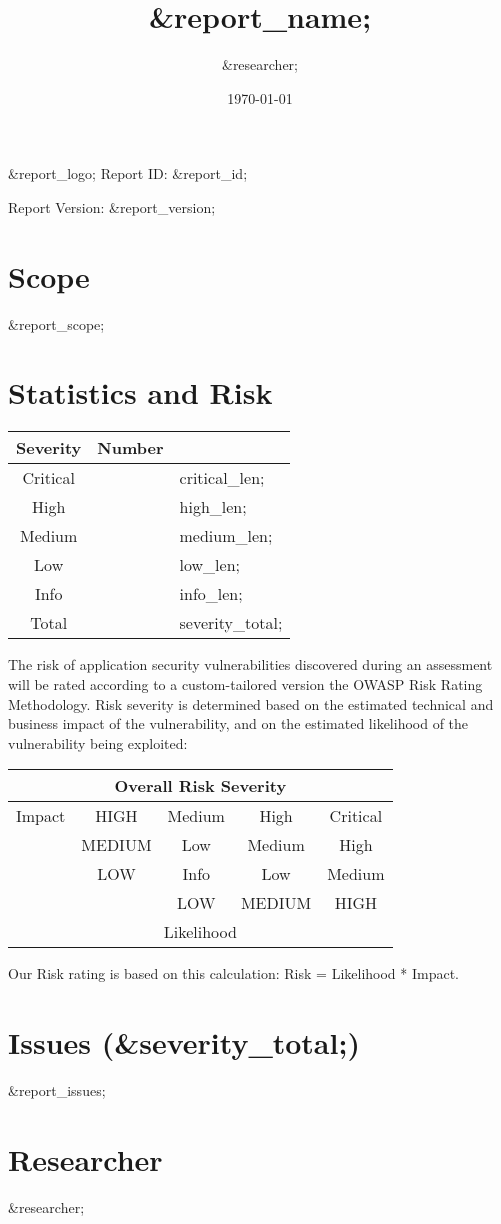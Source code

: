 \documentclass[12pt]{article}
\author{&researcher;}
\title{&report_name;}
\date{\today}
\begin{document}
\maketitle

&report_logo;
Report ID: &report_id;

Report Version: &report_version;
\newpage

\tableofcontents

\newpage

\section{Scope}

&report_scope;

\section{Statistics and Risk}

\begin{center}
\begin{tabular}{||c c||}
 \hline
 Severity & Number \\ [0.5ex] 
 \hline\hline
 Critical & &critical_len; \\ 
 \hline
 High & &high_len; \\
 \hline
 Medium & &medium_len; \\
 \hline
 Low & &low_len; \\
 \hline
 Info & &info_len; \\
 \hline
 Total & &severity_total; \\ [1ex] 
 \hline
\end{tabular}
\end{center}

The risk of application security vulnerabilities discovered during an assessment will be rated according to a custom-tailored version the OWASP Risk Rating Methodology. Risk severity is determined based on the estimated technical and business impact of the vulnerability, and on the estimated likelihood of the vulnerability being exploited:\\
\begin{center}
\begin{tabular}{|c|c|c|c|c|}\hline\hline
   \multicolumn{5}{|c|}{Overall Risk Severity}\\\hline\hline
      Impact & HIGH & Medium & High & Critical \\\cline{1-5}
	       & MEDIUM & Low & Medium & High \\\cline{1-5}
	       & LOW & Info & Low & Medium \\\cline{1-5}
                &   & LOW & MEDIUM & HIGH \\\cline{1-5}
   \multicolumn{5}{|c|}{Likelihood}\\\hline\hline
\end{tabular}
\end{center}

Our Risk rating is based on this calculation: Risk = Likelihood * Impact.

\section{Issues (&severity_total;)}

&report_issues;

\section{Researcher}

&researcher;
\end{document}
